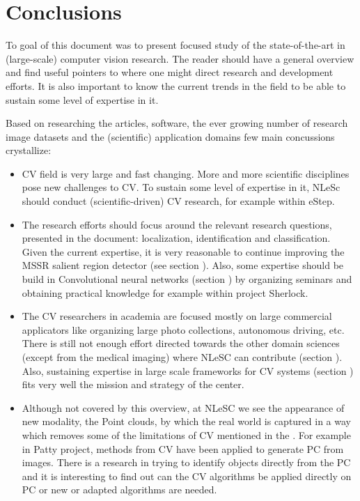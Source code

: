 \section{Conclusions}
\label{sec:conc}

To goal of  this document was to present focused study of the state-of-the-art in (large-scale) computer vision research. The reader should have a general overview and find useful pointers to where one might direct research and development efforts. It is also important to know the current trends in the field to be able to sustain some level of expertise in it.

Based on researching the articles, software, the ever growing number of research image datasets and the (scientific) application domains few main concussions crystallize:

\begin{itemize}
\item{CV field is very large and fast changing. More and more scientific disciplines pose new challenges to CV. To sustain some level of expertise in it, NLeSc should conduct (scientific-driven) CV research, for example within eStep.}
\item{The research efforts should focus around the relevant research questions, presented in the document: localization, identification and classification. Given the current expertise, it is very reasonable to continue improving the MSSR salient region detector (see section \underline{}). Also, some expertise should be build in Convolutional neural networks (section \underline{}) by organizing seminars and obtaining practical knowledge for example within project Sherlock.}
\item{The CV researchers in academia are focused mostly on large commercial applicators like organizing large photo collections, autonomous driving, etc. There is still not enough effort directed towards the other domain sciences (except from the medical imaging) where NLeSC can contribute (section \underline{}). Also, sustaining expertise in large scale frameworks for CV systems (section \underline{}) fits very well the mission and strategy of the center.}
\item{Although not covered by this overview, at NLeSC we see the appearance of new modality, the Point clouds, by which the real world is captured in a way which removes some of the limitations of CV mentioned in the . For example in Patty project, methods from CV have been applied to generate PC from images. There is a research in trying to identify objects directly from the PC and it is interesting to find out can the CV algorithms be applied directly on PC or new or adapted algorithms are needed.}

\end{itemize}

